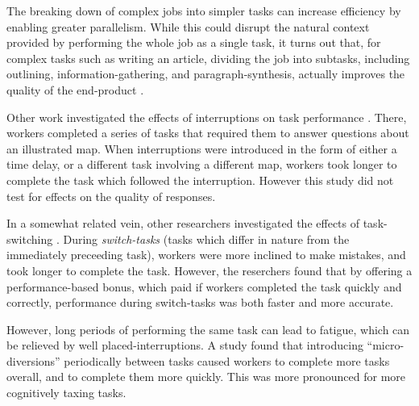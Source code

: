 \documentclass{sigchi}
\begin{document}
The breaking down of complex jobs into simpler tasks can increase
efficiency by enabling greater parallelism.
While this could disrupt the natural context provided by performing the
whole job as a single task, it turns out that, 
for complex tasks such as writing an article, 
dividing the job into subtasks, including outlining, 
information-gathering, and paragraph-synthesis, actually improves the
quality of the end-product \cite{kittur2011crowdforge}.

Other work investigated the effects of interruptions on task performance
\cite{laseckieffects}.  There, workers 
completed a series of tasks that required them to answer questions about
an illustrated map.  When interruptions were introduced
in the form of either a time delay, or a different task involving a
different map, workers took longer to complete the task which 
followed the interruption.  However this study did not test for
effects on the quality of responses.  

In a somewhat related vein, other researchers investigated 
the effects of task-switching \cite{yin2014monetary}.  During 
\textit{switch-tasks} (tasks which differ in nature from the immediately 
preceeding task), workers were more inclined to make mistakes, 
and took longer to complete the task.  
However, the reserchers found that by offering a performance-based
bonus, which paid if workers completed the task quickly and correctly,
performance during switch-tasks was both faster and more accurate.

However, long periods of performing the same task can lead to fatigue,
which can be relieved by well placed-interruptions.  A study 
\cite{dai2015and} found that introducing ``micro-diversions'' 
periodically between tasks caused workers to complete more tasks overall, 
and to complete them more quickly.  This was more pronounced for more 
cognitively taxing tasks.
\end{document}
